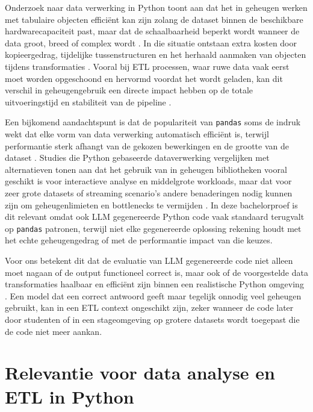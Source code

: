 Onderzoek naar data verwerking in Python toont aan dat het in geheugen werken met tabulaire objecten efficiënt kan zijn zolang de dataset binnen de beschikbare hardwarecapaciteit past, maar dat de schaalbaarheid beperkt wordt wanneer de data groot, breed of complex wordt \autocite{Petersohn2020}. In die situatie ontstaan extra kosten door kopieergedrag, tijdelijke tussenstructuren en het herhaald aanmaken van objecten tijdens transformaties \autocite{Petersohn2020,Mekouar2025}. Vooral bij ETL processen, waar ruwe data vaak eerst moet worden opgeschoond en hervormd voordat het wordt geladen, kan dit verschil in geheugengebruik een directe impact hebben op de totale uitvoeringstijd en stabiliteit van de pipeline \autocite{Mekouar2025}.

Een bijkomend aandachtspunt is dat de populariteit van \texttt{pandas} soms de indruk wekt dat elke vorm van data verwerking automatisch efficiënt is, terwijl performantie sterk afhangt van de gekozen bewerkingen en de grootte van de dataset \autocite{Breddels2018,Mekouar2025}. Studies die Python gebaseerde dataverwerking vergelijken met alternatieven tonen aan dat het gebruik van in geheugen bibliotheken vooral geschikt is voor interactieve analyse en middelgrote workloads, maar dat voor zeer grote datasets of streaming scenario's andere benaderingen nodig kunnen zijn om geheugenlimieten en bottlenecks te vermijden \autocite{Petersohn2020,Mekouar2025}. In deze bachelorproef is dit relevant omdat ook LLM gegenereerde Python code vaak standaard terugvalt op \texttt{pandas} patronen, terwijl niet elke gegenereerde oplossing rekening houdt met het echte geheugengedrag of met de performantie impact van die keuzes.

Voor ons betekent dit dat de evaluatie van LLM gegenereerde code niet alleen moet nagaan of de output functioneel correct is, maar ook of de voorgestelde data transformaties haalbaar en efficiënt zijn binnen een realistische Python omgeving \autocite{Breddels2018,Petersohn2020,Mekouar2025}. Een model dat een correct antwoord geeft maar tegelijk onnodig veel geheugen gebruikt, kan in een ETL context ongeschikt zijn, zeker wanneer de code later door studenten of in een stageomgeving op grotere datasets wordt toegepast die de code niet meer aankan.

\section{Relevantie voor data analyse en ETL in Python}

